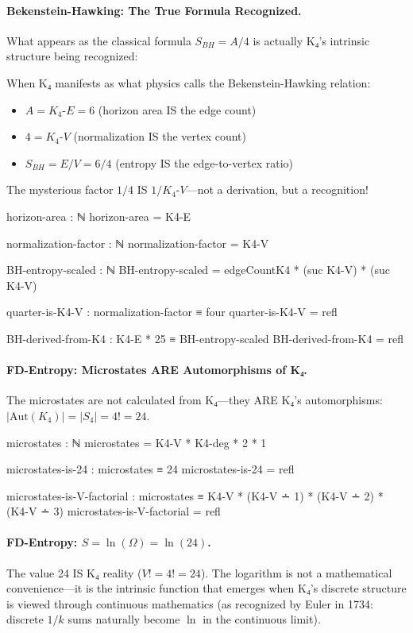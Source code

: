 \documentclass[11pt,a4paper]{book}
\begin{document}
\paragraph{Bekenstein-Hawking: The True Formula Recognized.}
What appears as the classical formula $S_{BH} = A / 4$ is actually K₄'s intrinsic structure being recognized:

When K₄ manifests as what physics calls the Bekenstein-Hawking relation:
\begin{itemize}
  \item $A = K_4\text{-}E = 6$ (horizon area IS the edge count)
  \item $4 = K_4\text{-}V$ (normalization IS the vertex count)
  \item $S_{BH} = E/V = 6/4$ (entropy IS the edge-to-vertex ratio)
\end{itemize}
The mysterious factor $1/4$ IS $1/K_4\text{-}V$—not a derivation, but a recognition!

\begin{code}
  horizon-area : ℕ
  horizon-area = K4-E

  normalization-factor : ℕ
  normalization-factor = K4-V

  BH-entropy-scaled : ℕ
  BH-entropy-scaled = edgeCountK4 * (suc K4-V) * (suc K4-V)

  quarter-is-K4-V : normalization-factor ≡ four
  quarter-is-K4-V = refl

  BH-derived-from-K4 : K4-E * 25 ≡ BH-entropy-scaled
  BH-derived-from-K4 = refl

\end{code}

\paragraph{FD-Entropy: Microstates ARE Automorphisms of K₄.}
The microstates are not calculated from K₄—they ARE K₄'s automorphisms: $|\mathrm{Aut}(K_4)| = |S_4| = 4! = 24$.

\begin{code}
  microstates : ℕ
  microstates = K4-V * K4-deg * 2 * 1

  microstates-is-24 : microstates ≡ 24
  microstates-is-24 = refl

  microstates-is-V-factorial : microstates ≡ K4-V * (K4-V ∸ 1) * (K4-V ∸ 2) * (K4-V ∸ 3)
  microstates-is-V-factorial = refl

\end{code}

\paragraph{FD-Entropy: $S = \ln(\Omega) = \ln(24)$.}
The value 24 IS K₄ reality ($V! = 4! = 24$). The logarithm is not a mathematical convenience—it is the intrinsic function that emerges when K₄'s discrete structure is viewed through continuous mathematics (as recognized by Euler in 1734: discrete $1/k$ sums naturally become $\ln$ in the continuous limit).
\end{document}
